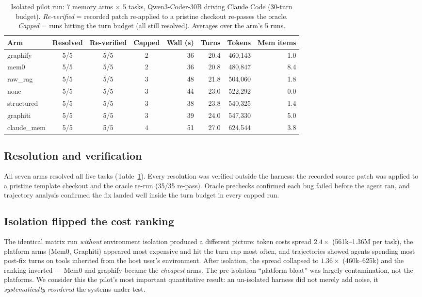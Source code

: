\documentclass[11pt]{article}
\begin{document}
\begin{table}[h]
\centering
\caption{Isolated pilot run: 7 memory arms $\times$ 5 tasks, Qwen3-Coder-30B driving Claude Code (30-turn budget). \emph{Re-verified} = recorded patch re-applied to a pristine checkout re-passes the oracle. \emph{Capped} = runs hitting the turn budget (all still resolved). Averages over the arm's 5 runs.}
\label{tab:main}
\small
\begin{tabular}{lcccrrrr}
\toprule
Arm & Resolved & Re-verified & Capped & Wall (s) & Turns & Tokens & Mem items \\
\midrule
graphify        & 5/5 & 5/5 & 2 & 36 & 20.4 & 460{,}143 & 1.0 \\
mem0            & 5/5 & 5/5 & 2 & 36 & 20.8 & 480{,}847 & 8.4 \\
raw\_rag        & 5/5 & 5/5 & 3 & 48 & 21.8 & 504{,}060 & 1.8 \\
none            & 5/5 & 5/5 & 3 & 44 & 23.0 & 522{,}292 & 0.0 \\
structured      & 5/5 & 5/5 & 3 & 38 & 23.8 & 540{,}325 & 1.4 \\
graphiti        & 5/5 & 5/5 & 3 & 39 & 24.0 & 547{,}330 & 5.0 \\
claude\_mem     & 5/5 & 5/5 & 4 & 51 & 27.0 & 624{,}544 & 3.8 \\
\bottomrule
\end{tabular}
\end{table}

\subsection{Resolution and verification}
All seven arms resolved all five tasks (Table~\ref{tab:main}). Every resolution was verified outside the harness: the recorded source patch was applied to a pristine template checkout and the oracle re-run (35/35 re-pass). Oracle prechecks confirmed each bug failed before the agent ran, and trajectory analysis confirmed the fix landed well inside the turn budget in every capped run.

\subsection{Isolation flipped the cost ranking}
The identical matrix run \emph{without} environment isolation produced a different picture: token costs spread $2.4\times$ (561k--1.36M per task), the platform arms (Mem0, Graphiti) appeared most expensive and hit the turn cap most often, and trajectories showed agents spending most post-fix turns on tools inherited from the host user's environment. After isolation, the spread collapsed to $1.36\times$ (460k--625k) and the ranking inverted --- Mem0 and graphify became the \emph{cheapest} arms. The pre-isolation ``platform bloat'' was largely contamination, not the platforms. We consider this the pilot's most important quantitative result: an un-isolated harness did not merely add noise, it \emph{systematically reordered} the systems under test.
\end{document}
